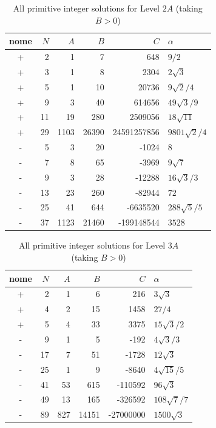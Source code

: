 \documentclass[11pt,a4paper]{amsart} %
\theoremstyle{definition}
\begin{document}
\begin{table}[htbp]
\centering
\caption{All primitive integer solutions for Level \(2A\) (taking \(B>0\))}\label{tab:2A}
\footnotesize
\setlength{\tabcolsep}{4pt}
\renewcommand{\arraystretch}{1.14}
\begin{tabular}{@{}c r r r r l@{}}
\toprule
nome & \(N\) & \(A\) & \(B\) & \(C\) & \(\alpha\)\\
\midrule
+&2&1&7&648&\(9/2\)\\
+&3&1&8&2304&\(2\sqrt3\)\\
+&5&1&10&20736&\(9\sqrt2/4\)\\
+&9&3&40&614656&\(49\sqrt3/9\)\\
+&11&19&280&2509056&\(18\sqrt{11}\)\\
+&29&1103&26390&24591257856&\(9801\sqrt2/4\)\\
-&5&3&20&-1024&\(8\)\\
-&7&8&65&-3969&\(9\sqrt7\)\\
-&9&3&28&-12288&\(16\sqrt3/3\)\\
-&13&23&260&-82944&\(72\)\\
-&25&41&644&-6635520&\(288\sqrt5/5\)\\
-&37&1123&21460&-199148544&\(3528\)\\
\bottomrule
\end{tabular}
\end{table}

\begin{table}[htbp]
\centering
\caption{All primitive integer solutions for Level \(3A\) (taking \(B>0\))}\label{tab:3A}
\footnotesize
\setlength{\tabcolsep}{4pt}
\renewcommand{\arraystretch}{1.14}
\begin{tabular}{@{}c r r r r l@{}}
\toprule
nome & \(N\) & \(A\) & \(B\) & \(C\) & \(\alpha\)\\
\midrule
+&2&1&6&216&\(3\sqrt3\)\\
+&4&2&15&1458&\(27/4\)\\
+&5&4&33&3375&\(15\sqrt3/2\)\\
-&9&1&5&-192&\(4\sqrt3/3\)\\
-&17&7&51&-1728&\(12\sqrt3\)\\
-&25&1&9&-8640&\(4\sqrt{15}/5\)\\
-&41&53&615&-110592&\(96\sqrt3\)\\
-&49&13&165&-326592&\(108\sqrt7/7\)\\
-&89&827&14151&-27000000&\(1500\sqrt3\)\\
\bottomrule
\end{tabular}
\end{table}
\end{document}
